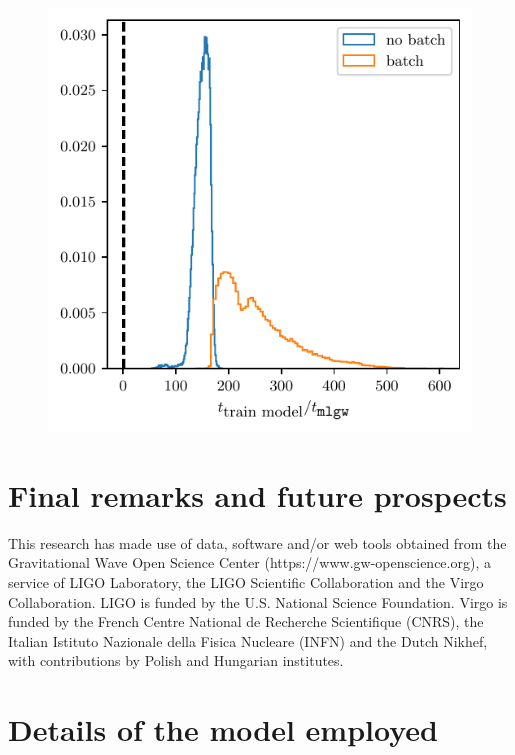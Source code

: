 \documentclass[twocolumn,showpacs,preprintnumbers,nofootinbib,prd,
superscriptaddress,10pt]{revtex4-1}
\begin{document}
\begin{figure}[t]
	\centering
	\includegraphics[scale = 1]{timing}
	\caption{}
	\label{fig:timing_hist}
\end{figure}


\section{Final remarks and future prospects}
\label{sec:end}
\blindtext



        \begin{acknowledgments}
          This research has made use of data, software and/or web tools obtained 
          from the Gravitational Wave Open Science Center (https://www.gw-openscience.org), 
          a service of LIGO Laboratory, the LIGO Scientific Collaboration and the 
          Virgo Collaboration. LIGO is funded by the U.S. National Science Foundation. 
          Virgo is funded by the French Centre National de Recherche Scientifique (CNRS), 
          the Italian Istituto Nazionale della Fisica Nucleare (INFN) and the 
          Dutch Nikhef, with contributions by Polish and Hungarian institutes.
        \end{acknowledgments}

	
\appendix

\section{Details of the model employed}\label{app:model}


	
	
\end{document}
